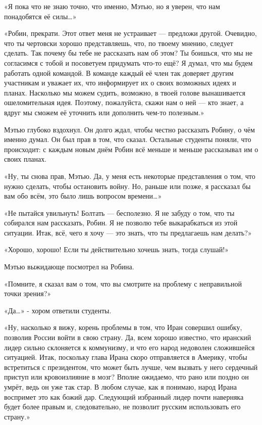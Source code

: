 \documentclass[a5paper, 9pt,
final, openany, twoside=true]{memoir}
\begin{document}
	«Я пока что не знаю точно, что именно, Мэтью, но я уверен, что нам понадобятся её силы…»

«Робин, прекрати. Этот ответ меня не устраивает — предложи другой. Очевидно, что ты чертовски хорошо представляешь, что, по твоему мнению, следует сделать. Так почему бы тебе не рассказать нам об этом? Ты боишься, что мы не согласимся с тобой и посоветуем придумать что-то ещё? Я думал, что мы будем работать одной командой. В команде каждый её член так доверяет другим участникам и уважает их, что информирует их о своих возможных идеях и планах. Насколько мы можем судить, возможно, в твоей голове вынашивается ошеломительная идея. Поэтому, пожалуйста, скажи нам о ней — кто знает, а вдруг мы сможем её уточнить или дополнить чем-то полезным.»

Мэтью глубоко вздохнул. Он долго ждал, чтобы честно рассказать Робину, о чём именно думал. Он был прав в том, что сказал. Остальные студенты поняли, что происходит: с каждым новым днём Робин всё меньше и меньше рассказывал им о своих планах.

«Ну, ты снова прав, Мэтью. Да, у меня есть некоторые представления о том, что нужно сделать, чтобы остановить войну. Но, раньше или позже, я рассказал бы вам обо всём, это было лишь вопросом времени…»

«Не пытайся увильнуть! Болтать — бесполезно. Я не забуду о том, что ты собирался нам рассказать, Робин. Я не позволю тебе выкарабкаться из этой ситуации. Итак, всё, чего я хочу — это знать, что ты предлагаешь нам делать?»

«Хорошо, хорошо! Если ты действительно хочешь знать, тогда слушай!»

Мэтью выжидающе посмотрел на Робина.

«Помните, я сказал вам о том, что вы смотрите на проблему с неправильной точки зрения?»

«Да…» - хором ответили студенты.

«Ну, насколько я вижу, корень проблемы в том, что Иран совершил ошибку, позволив России войти в свою страну. Да, всем хорошо известно, что иранский лидер сильно склоняется к коммунизму, и что его народ недоволен сложившейся ситуацией. Итак, поскольку глава Ирана скоро отправляется в Америку, чтобы встретиться с президентом, что может быть лучше, чем вызвать у него сердечный приступ или кровоизлияние в мозг? Вполне ожидаемо, что рано или поздно он умрёт, ведь он уже так стар. В любом случае, как я понимаю, народ Ирана воспримет это как божий дар. Следующий избранный лидер почти наверняка будет более правым и, следовательно, не позволит русским использовать его страну.»
\end{document}
